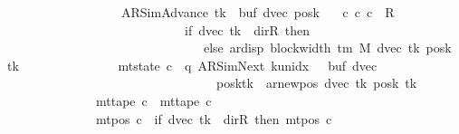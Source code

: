 \begin{isabellebody}
\ \ \ \ \ \ \ \ \ \ \ \ \ \ \ \ \ \ \ {\isacharparenleft}{\kern0pt}AR{\isacharunderscore}{\kern0pt}SimAdvance{\isacharcomma}{\kern0pt}\ tk{\isacharcomma}{\kern0pt}\ {}{\isacharcomma}{\kern0pt}\ buf{\isacharcomma}{\kern0pt}\ dvec{\isacharcomma}{\kern0pt}\ posk{\isacharparenright}{\kern0pt}{\isachardoublequoteclose}\isanewline
\ \ \ {\isachardoublequoteopen}{\isasymexists}c{\isacharprime}{\kern0pt}{\isachardot}{\kern0pt}\ {\isacharparenleft}{\kern0pt}c{}{\isacharcomma}{\kern0pt}\ c{\isacharprime}{\kern0pt}{\isacharparenright}{\kern0pt}\ {\isasymin}\ R{\isacharprime}{\kern0pt}\isanewline
\ \ \ \ \ \ \ \ \ \ \ \ \ \ \ \ \ \ \ \ \ \ \ \ \ \ \ \ {\isacharcircum}{\kern0pt}{\isacharcircum}{\kern0pt}\ {\isacharparenleft}{\kern0pt}if\ dvec\ tk\ {\isacharequal}{\kern0pt}\ dir{\isachardot}{\kern0pt}R\ then\ {}\isanewline
\ \ \ \ \ \ \ \ \ \ \ \ \ \ \ \ \ \ \ \ \ \ \ \ \ \ \ \ \ \ \ \ else\ ar{\isacharunderscore}{\kern0pt}disp\ {\isacharparenleft}{\kern0pt}block{\isacharunderscore}{\kern0pt}width\ {\isacharparenleft}{\kern0pt}{\isasymGamma}{\isacharunderscore}{\kern0pt}tm\ M{\isacharparenright}{\kern0pt}{\isacharparenright}{\kern0pt}\ {\isacharparenleft}{\kern0pt}dvec\ tk{\isacharparenright}{\kern0pt}\ {\isacharparenleft}{\kern0pt}posk\ tk{\isacharparenright}{\kern0pt}{\isacharparenright}{\kern0pt}\isanewline
\ \ \ \ \ \ \ \ \ \ \ \ \ \ {\isasymand}\ mt{\isacharunderscore}{\kern0pt}state\ c{\isacharprime}{\kern0pt}\ {\isacharequal}{\kern0pt}\ {\isacharparenleft}{\kern0pt}q{\isacharcomma}{\kern0pt}\ AR{\isacharunderscore}{\kern0pt}SimNext{\isacharcomma}{\kern0pt}\ k{\isacharunderscore}{\kern0pt}unidx\ {}{\isacharcomma}{\kern0pt}\ {}{\isacharcomma}{\kern0pt}\ buf{\isacharcomma}{\kern0pt}\ dvec{\isacharcomma}{\kern0pt}\isanewline
\ \ \ \ \ \ \ \ \ \ \ \ \ \ \ \ \ \ \ \ \ \ \ \ \ \ \ \ \ \ \ \ \ \ posk{\isacharparenleft}{\kern0pt}tk\ {\isacharcolon}{\kern0pt}{\isacharequal}{\kern0pt}\ ar{\isacharunderscore}{\kern0pt}newpos\ {\isacharparenleft}{\kern0pt}dvec\ tk{\isacharparenright}{\kern0pt}\ {\isacharparenleft}{\kern0pt}posk\ tk{\isacharparenright}{\kern0pt}{\isacharparenright}{\kern0pt}{\isacharparenright}{\kern0pt}\isanewline
\ \ \ \ \ \ \ \ \ \ \ \ \ \ {\isasymand}\ mt{\isacharunderscore}{\kern0pt}tape\ c{\isacharprime}{\kern0pt}\ {\isacharequal}{\kern0pt}\ mt{\isacharunderscore}{\kern0pt}tape\ c{}\isanewline
\ \ \ \ \ \ \ \ \ \ \ \ \ \ {\isasymand}\ mt{\isacharunderscore}{\kern0pt}pos\ c{\isacharprime}{\kern0pt}\ {\isacharequal}{\kern0pt}\ {\isacharparenleft}{\kern0pt}if\ dvec\ tk\ {\isacharequal}{\kern0pt}\ dir{\isachardot}{\kern0pt}R\ then\ mt{\isacharunderscore}{\kern0pt}pos\ c{}\isanewline

\end{isabellebody}

